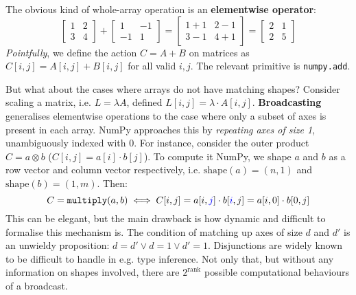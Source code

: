 The obvious kind of whole-array operation is an \textbf{elementwise operator}:
$$ \begin{bmatrix} 1 & 2 \\ 3 & 4 \end{bmatrix} 
+ \begin{bmatrix}1 & -1 \\ -1 & 1 \end{bmatrix}
= \begin{bmatrix}1 + 1 & 2 - 1 \\ 3 - 1 & 4 + 1 \end{bmatrix}
= \begin{bmatrix}2 & 1 \\ 2 & 5 \end{bmatrix} $$
\textit{Pointfully}, we define the action $C = A + B$ on matrices as $C[i, j] = A[i, j] + B[i, j]$ for all valid $i, j$. The relevant primitive is \texttt{numpy.add}. 

But what about the cases where arrays do not have matching shapes? Consider scaling a matrix, i.e. $L = \lambda A$, defined $L[i, j] = \lambda \cdot A[i, j]$. \textbf{Broadcasting} generalises elementwise operations to the case where only a subset of axes is present in each array. NumPy approaches this by \textit{repeating axes of size 1}, unambiguously indexed with $0$. For instance, consider the outer product $C = a \otimes b$ ($C[i, j] = a[i] \cdot b[j] $). To compute it NumPy, we shape $a$ and $b$ as a row vector and column vector respectively, i.e. $\mathrm{shape}(a) = (n, 1)$ and $\mathrm{shape}(b) = (1, m)$. Then:
$$ C = \texttt{multiply}(a, b) \iff C[i, j] = a[i, {\color{blue} j}] \cdot b[{\color{blue} i}, j] = a[i, 0] \cdot b[0, j] $$
This can be elegant, but the main drawback is how dynamic and difficult to formalise this mechanism is. The condition of matching up axes of size $d$ and $d'$ is an unwieldy proposition: $d = d' \lor d = 1 \lor d' = 1 $. Disjunctions are widely known to be difficult to handle in e.g. type inference.
Not only that, but without any information on shapes involved, there are $2^{\mathrm{rank}}$ possible computational behaviours of a broadcast.

